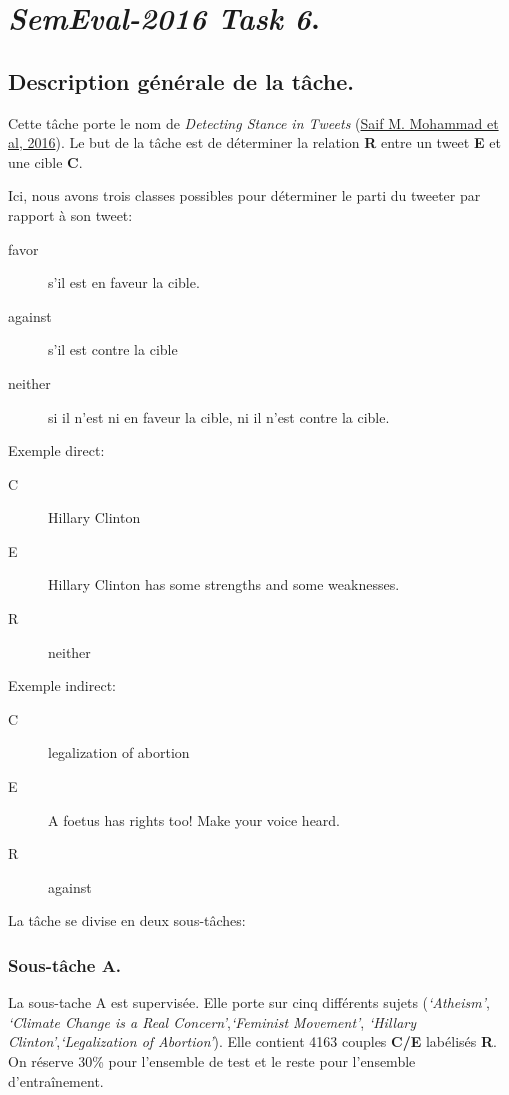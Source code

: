 \documentclass[onecolumn, 12pt]{article}
\begin{document}

\section{\textit{SemEval-2016 Task 6}.}
\subsection{Description générale de la tâche.}
Cette tâche porte le nom de \og \textit{Detecting Stance in Tweets} \fg (\href{https://www.aclweb.org/anthology/S/S16/S16-1003.pdf}{Saif M.
Mohammad et al, 2016}).
Le but de la tâche est de déterminer la relation \textbf{R} entre un tweet \textbf{E} et une cible \textbf{C}.

Ici, nous avons trois classes possibles pour déterminer le parti du tweeter par rapport à son tweet:
\begin{description}
 \item [favor] s'il est en faveur la cible.
 \item [against] s'il est contre la cible
 \item [neither] si il n'est ni en faveur la cible, ni il n'est contre la cible.
\end{description}

Exemple direct:

\begin{description}
 \item [C] Hillary Clinton
 \item [E] Hillary Clinton has some strengths and some weaknesses.
 \item [R] neither
\end{description}

Exemple indirect:
\begin{description}
 \item [C] legalization of abortion
 \item [E] A foetus has rights too! Make your voice heard.
 \item [R] against
\end{description}

\newpage
La tâche se divise en deux sous-tâches:

\subsubsection{Sous-tâche A.}
La sous-tache A est supervisée.
Elle porte sur cinq différents sujets (\textit{‘Atheism’},\textit{ ‘Climate Change is a Real Concern’},\textit{‘Feminist Movement’}, \textit{‘Hillary Clinton’},\textit{‘Legalization of Abortion’}).
Elle contient 4163 couples \textbf{C/E} labélisés \textbf{R}.
On réserve 30\% pour l'ensemble de test et le reste pour l'ensemble d'entraînement.
\end{document}
